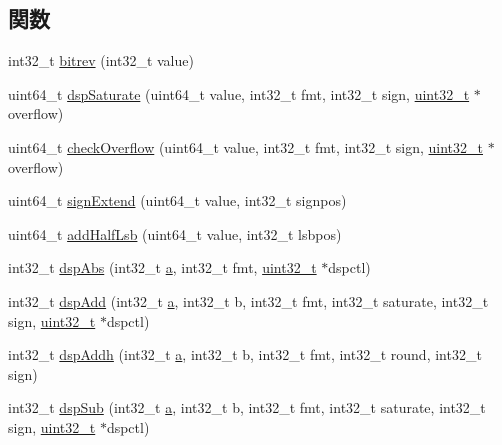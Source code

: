 \subsection*{関数}
\begin{DoxyCompactItemize}
\item 
int32\_\-t \hyperlink{namespaceMipsISA_a2754048764e174b0f0803486e4f829fd}{bitrev} (int32\_\-t value)
\item 
uint64\_\-t \hyperlink{namespaceMipsISA_a6853d9869c3a54c5a5cd34594ecf1f30}{dspSaturate} (uint64\_\-t value, int32\_\-t fmt, int32\_\-t sign, \hyperlink{Type_8hh_a435d1572bf3f880d55459d9805097f62}{uint32\_\-t} $\ast$overflow)
\item 
uint64\_\-t \hyperlink{namespaceMipsISA_aa0232b8b21b63c7893efa2ccbe2ad833}{checkOverflow} (uint64\_\-t value, int32\_\-t fmt, int32\_\-t sign, \hyperlink{Type_8hh_a435d1572bf3f880d55459d9805097f62}{uint32\_\-t} $\ast$overflow)
\item 
uint64\_\-t \hyperlink{namespaceMipsISA_a769dba9c69d884afe2d99cd0fcdb17bb}{signExtend} (uint64\_\-t value, int32\_\-t signpos)
\item 
uint64\_\-t \hyperlink{namespaceMipsISA_a6ca3b5075cddff927b0b7870b8b73d5f}{addHalfLsb} (uint64\_\-t value, int32\_\-t lsbpos)
\item 
int32\_\-t \hyperlink{namespaceMipsISA_a31dde0cc194f6c034d86c7c15efeb4c0}{dspAbs} (int32\_\-t \hyperlink{namespaceMipsISA_ad15ace88a723e43c4e98c8c646891e79}{a}, int32\_\-t fmt, \hyperlink{Type_8hh_a435d1572bf3f880d55459d9805097f62}{uint32\_\-t} $\ast$dspctl)
\item 
int32\_\-t \hyperlink{namespaceMipsISA_a705975465e26de40169cc93f7a09aa3b}{dspAdd} (int32\_\-t \hyperlink{namespaceMipsISA_ad15ace88a723e43c4e98c8c646891e79}{a}, int32\_\-t b, int32\_\-t fmt, int32\_\-t saturate, int32\_\-t sign, \hyperlink{Type_8hh_a435d1572bf3f880d55459d9805097f62}{uint32\_\-t} $\ast$dspctl)
\item 
int32\_\-t \hyperlink{namespaceMipsISA_a6fd720eeab47ea9cf3354a636744e70c}{dspAddh} (int32\_\-t \hyperlink{namespaceMipsISA_ad15ace88a723e43c4e98c8c646891e79}{a}, int32\_\-t b, int32\_\-t fmt, int32\_\-t round, int32\_\-t sign)
\item 
int32\_\-t \hyperlink{namespaceMipsISA_a6fe8ea50b57a4afbe6899cf5fcd52298}{dspSub} (int32\_\-t \hyperlink{namespaceMipsISA_ad15ace88a723e43c4e98c8c646891e79}{a}, int32\_\-t b, int32\_\-t fmt, int32\_\-t saturate, int32\_\-t sign, \hyperlink{Type_8hh_a435d1572bf3f880d55459d9805097f62}{uint32\_\-t} $\ast$dspctl)
\item 

\end{DoxyCompactItemize}
